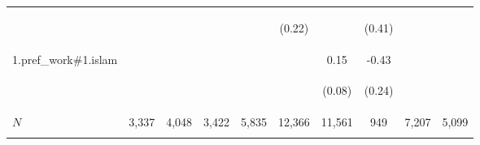 \begin{center}
\begin{tabular}{lccccccccc}
 & \begin{footnotesize}\end{footnotesize} & \begin{footnotesize}\end{footnotesize} & \begin{footnotesize}\end{footnotesize} & \begin{footnotesize}\end{footnotesize} & \begin{footnotesize}(0.22)\end{footnotesize} & \begin{footnotesize}\end{footnotesize} & \begin{footnotesize}(0.41)\end{footnotesize} & \begin{footnotesize}\end{footnotesize} & \begin{footnotesize}\end{footnotesize}\\
\noalign{\smallskip}1.pref_work\#1.islam &  &  &  &  &  & 0.15 & -0.43 &  & \\
 & \begin{footnotesize}\end{footnotesize} & \begin{footnotesize}\end{footnotesize} & \begin{footnotesize}\end{footnotesize} & \begin{footnotesize}\end{footnotesize} & \begin{footnotesize}\end{footnotesize} & \begin{footnotesize}(0.08)\end{footnotesize} & \begin{footnotesize}(0.24)\end{footnotesize} & \begin{footnotesize}\end{footnotesize} & \begin{footnotesize}\end{footnotesize}\\
\noalign{\smallskip}$N$ & 3,337 & 4,048 & 3,422 & 5,835 & 12,366 & 11,561 & 949 & 7,207 & 5,099\\
\noalign{\smallskip}\hline\end{tabular}\\
\end{center}

